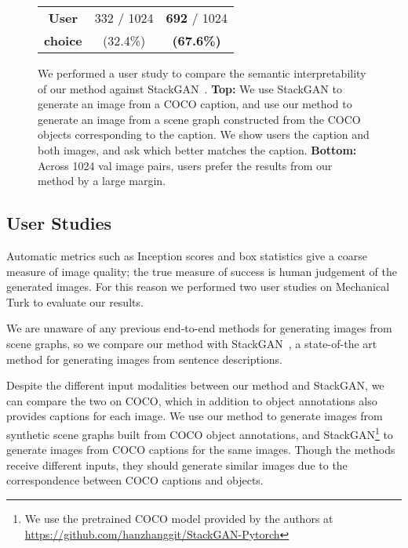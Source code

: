 \documentclass[10pt,twocolumn,letterpaper]{article}
\begin{document}
\begin{figure}
\begin{tabular}{c|c|c}
    \hline
    \textbf{User}  & \hspace{1mm} 332 / 1024 \hspace{1mm} & \hspace{1mm} \textbf{692} / 1024 \hspace{1mm} \\
    \textbf{choice}  & (32.4\%) & \textbf{(67.6\%)}
  \end{tabular}
  \vspace{1mm}
  \caption{
    We performed a user study to compare the semantic interpretability of our method against
    StackGAN~\cite{zhang2017stackgan}. \textbf{Top:} We use StackGAN to generate an image from a
    COCO caption, and use our method to generate an image from a scene graph constructed from the
    COCO objects corresponding to the caption. We show users the caption and both images,
    and ask which better matches the caption. \textbf{Bottom:} Across 1024 val image pairs, users prefer the
    results from our method by a large margin.
  }
  \vspace{-4mm}
  \label{fig:caption-study}
\end{figure}
 
\subsection{User Studies}
\label{sec:user-study}
Automatic metrics such as Inception scores and box statistics give a
coarse measure of image quality; the true measure of success is
human judgement of the generated images. For this reason we performed two user
studies on Mechanical Turk to evaluate our results.

We are unaware of any previous end-to-end methods for generating images from
scene graphs, so we compare our method with StackGAN~\cite{zhang2017stackgan},
a state-of-the art method for generating images from sentence descriptions.

Despite the different input modalities between our method and StackGAN, we can
compare the two on COCO, which in addition to object annotations also provides
captions for each image.
We use our method to generate images from synthetic scene
graphs built from COCO object annotations, and StackGAN\footnote{We use the pretrained COCO model provided by the authors at \url{https://github.com/hanzhanggit/StackGAN-Pytorch}} to generate images from COCO captions for the same images.
Though the methods receive different inputs, they should generate similar images due to the correspondence between COCO captions and objects.
\end{document}
